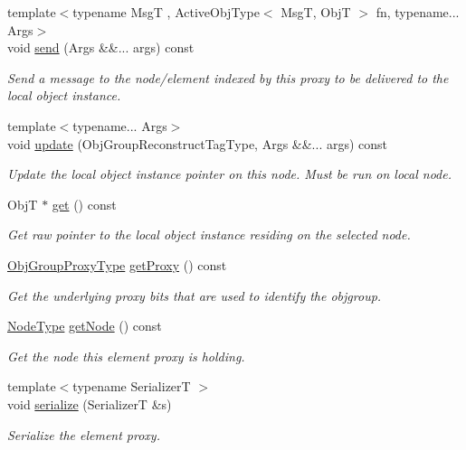 \begin{DoxyCompactItemize}
{\footnotesize template$<$typename MsgT , Active\+Obj\+Type$<$ Msg\+T, Obj\+T $>$ fn, typename... Args$>$ }\\void \hyperlink{structvt_1_1objgroup_1_1proxy_1_1_proxy_elm_aadfbb21b80482657fd2a7eba65ad7b48}{send} (Args \&\&... args) const
\begin{DoxyCompactList}\small\item\em Send a message to the node/element indexed by this proxy to be delivered to the local object instance. \end{DoxyCompactList}\item 
{\footnotesize template$<$typename... Args$>$ }\\void \hyperlink{structvt_1_1objgroup_1_1proxy_1_1_proxy_elm_ac86c33cf46c63e61413b07509d3b9005}{update} (Obj\+Group\+Reconstruct\+Tag\+Type, Args \&\&... args) const
\begin{DoxyCompactList}\small\item\em Update the local object instance pointer on this node. Must be run on local node. \end{DoxyCompactList}\item 
ObjT $\ast$ \hyperlink{structvt_1_1objgroup_1_1proxy_1_1_proxy_elm_a4acec5b08c91f8d23a19cc6a61b19c48}{get} () const
\begin{DoxyCompactList}\small\item\em Get raw pointer to the local object instance residing on the selected node. \end{DoxyCompactList}\item 
\hyperlink{namespacevt_ad7cae989df485fccca57f0792a880a8e}{Obj\+Group\+Proxy\+Type} \hyperlink{structvt_1_1objgroup_1_1proxy_1_1_proxy_elm_ae7cbfe997421f265fa51cd29adc6957e}{get\+Proxy} () const
\begin{DoxyCompactList}\small\item\em Get the underlying proxy bits that are used to identify the objgroup. \end{DoxyCompactList}\item 
\hyperlink{namespacevt_a866da9d0efc19c0a1ce79e9e492f47e2}{Node\+Type} \hyperlink{structvt_1_1objgroup_1_1proxy_1_1_proxy_elm_a2a2067c00f4d5bc4b07dfb371f2f0d7a}{get\+Node} () const
\begin{DoxyCompactList}\small\item\em Get the node this element proxy is holding. \end{DoxyCompactList}\item 
{\footnotesize template$<$typename SerializerT $>$ }\\void \hyperlink{structvt_1_1objgroup_1_1proxy_1_1_proxy_elm_aa2c6be8bfa1113516cd6e8b3d7bd0445}{serialize} (SerializerT \&s)
\begin{DoxyCompactList}\small\item\em Serialize the element proxy. \end{DoxyCompactList}\end{DoxyCompactItemize}
